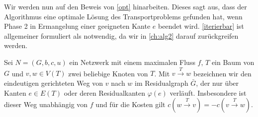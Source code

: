 Wir werden nun auf den Beweis von \cref{opt} hinarbeiten. Dieses sagt aus, dass der Algorithmus eine optimale Lösung des Transportproblems gefunden hat, wenn Phase 2 in Ermangelung einer geeigneten Kante $e$ beendet wird. \cref{iterierbar} ist allgemeiner formuliert als notwendig, da wir in \cref{ch:alg2} darauf zurückgreifen werden.

\begin{nota}Sei $N=(G,b,c,u)$ ein Netzwerk mit einem maximalen Fluss $f$, $T$ ein Baum von $G$ und $v,w\in V(T)$ zwei beliebige Knoten von $T$. Mit $v\xrightarrow{T}w$ bezeichnen wir den eindeutigen gerichteten Weg von $v$ nach $w$ im Residualgraph $\bar{G}$, der nur über Kanten $e\in E(T)$ oder deren Residualkanten $\varphi(e)$ verläuft. Insbesondere ist dieser Weg unabhängig von $f$ und für die Kosten gilt $c(w\xrightarrow{T}v) = -c(v\xrightarrow{T}w)$.\end{nota}


